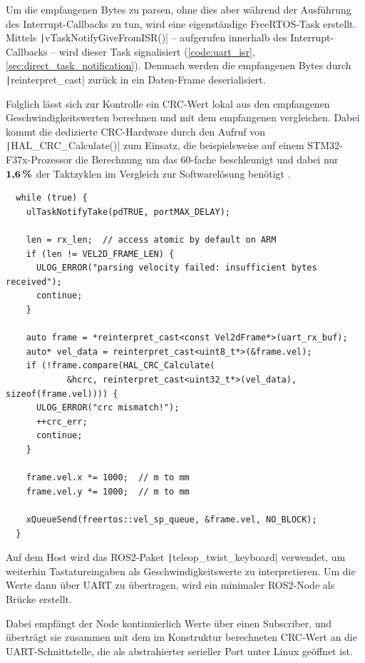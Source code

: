 Um die empfangenen Bytes zu parsen, ohne dies aber während der Ausführung des
Interrupt-Callbacks zu tun, wird eine eigenständige FreeRTOS-Task erstellt.
Mittels \texttt|vTaskNotifyGiveFromISR()| -- aufgerufen innerhalb des
Interrupt-Callbacks -- wird dieser Task signalisiert (\ref{code:uart_isr},
\ref{sec:direct_task_notification}). Demnach werden die empfangenen Bytes durch
\texttt|reinterpret_cast| zurück in ein Daten-Frame deserialisiert.

Folglich lässt sich zur Kontrolle ein CRC-Wert lokal aus den empfangenen
Geschwindigkeitswerten berechnen und mit dem empfangenen vergleichen. Dabei
kommt die dedizierte CRC-Hardware durch den Aufruf von
\texttt|HAL_CRC_Calculate()| zum Einsatz, die beispielsweise auf einem
STM32-F37x-Prozessor die Berechnung um das 60-fache beschleunigt und dabei nur
$\textbf{1,6\,\%}$ der Taktzyklen im Vergleich zur Softwarelösung benötigt
\cite[S. 9]{AN4187}.

\begin{code}
\begin{verbatim}
  while (true) {
    ulTaskNotifyTake(pdTRUE, portMAX_DELAY);

    len = rx_len;  // access atomic by default on ARM
    if (len != VEL2D_FRAME_LEN) {
      ULOG_ERROR("parsing velocity failed: insufficient bytes received");
      continue;
    }

    auto frame = *reinterpret_cast<const Vel2dFrame*>(uart_rx_buf);
    auto* vel_data = reinterpret_cast<uint8_t*>(&frame.vel);
    if (!frame.compare(HAL_CRC_Calculate(
            &hcrc, reinterpret_cast<uint32_t*>(vel_data), sizeof(frame.vel)))) {
      ULOG_ERROR("crc mismatch!");
      ++crc_err;
      continue;
    }

    frame.vel.x *= 1000;  // m to mm
    frame.vel.y *= 1000;  // m to mm

    xQueueSend(freertos::vel_sp_queue, &frame.vel, NO_BLOCK);
  }
\end{verbatim}
\end{code}

Auf dem Host wird das ROS2-Paket \texttt|teleop_twist_keyboard|
verwendet, um weiterhin Tastatureingaben als Geschwindigkeitswerte zu
interpretieren. Um die Werte dann über UART zu übertragen, wird ein minimaler
ROS2-Node als Brücke erstellt.

Dabei empfängt der Node kontinuierlich Werte über einen Subscriber, und
überträgt sie zusammen mit dem im Konstruktur berechneten CRC-Wert an die
UART-Schnittstelle, die als abstrahierter serieller Port unter Linux geöffnet
ist.

